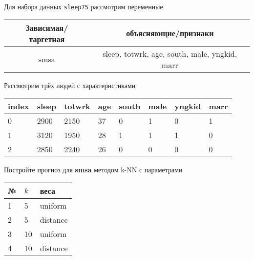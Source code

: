 \begin{exercise}
Для набора данных \texttt{sleep75} рассмотрим переменные
\begin{center}
	\begin{tabular}{|c|c|} \hline
		Зависимая/таргетная & объясняющие/признаки \\ \hline
		smsa & sleep, totwrk, age, south, male, yngkid, marr \\ \hline
	\end{tabular}
\end{center}
Рассмотрим трёх людей с характеристиками
\begin{center}
	\begin{tabular}{|l||l|l|l|l|l|l|l|}\hline
		index & sleep & totwrk & age & south & male & yngkid & marr \\ \hline\hline
		0 & 2900 & 2150 & 37 & 0 & 1 &  0 & 1 \\
		1 & 3120 & 1950 & 28 & 1 & 1 &  1 & 0 \\
		2 & 2850 & 2240 & 26 & 0 & 0 &  0 & 0 \\ \hline
	\end{tabular}
\end{center}
Постройте прогноз для \textbf{smsa} методом k-NN с параметрами
\begin{center}
	\begin{tabular}{|l|l|l|}\hline
	№ & \(k\) & веса \\ \hline
	1 & 5 & uniform \\
	2 & 5 & distance \\
	3 & 10 & uniform \\
	4 & 10 & distance \\ \hline
	\end{tabular}
\end{center}
\end{exercise}

